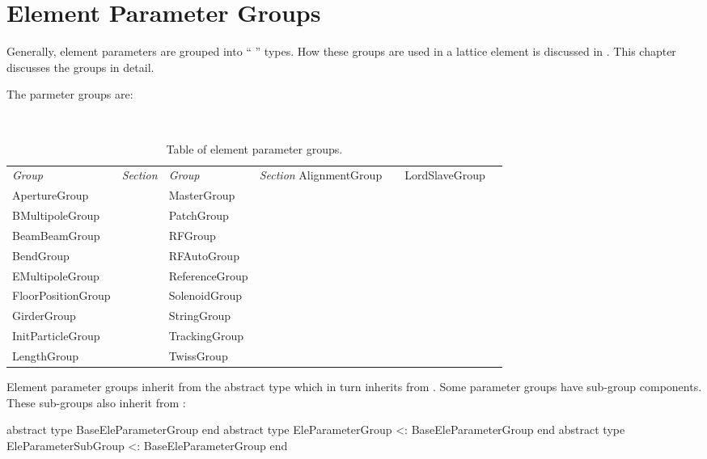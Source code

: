 \chapter{Element Parameter Groups}
\label{c:ele.groups}

Generally, element parameters are grouped into ``  '' 
types. How these groups are used in a lattice element is discussed in . 
This chapter discusses the groups in detail.

The parmeter groups are:
\begin{table}[htb]
\centering
{\tt
\begin{tabular}{llll} \toprule
  {\it Group}        & {\it Section}             & {\it Group}         & {\it Section}          \midrule
 AlignmentGroup      &       & LordSlaveGroup      &  \\
 ApertureGroup       &        & MasterGroup         &      \\
 BMultipoleGroup     &      & PatchGroup          &       \\ 
 BeamBeamGroup       &       & RFGroup             &          \\
 BendGroup           &            & RFAutoGroup         &      \\
 EMultipoleGroup     &      & ReferenceGroup      &   \\
 FloorPositionGroup  &       & SolenoidGroup       &    \\
 GirderGroup         &          & StringGroup         &      \\
 InitParticleGroup   &   & TrackingGroup       &    \\
 LengthGroup         &          & TwissGroup          &       \\ 
  \bottomrule
\end{tabular}
} 
\caption{Table of element parameter groups.}
\label{t:ele.param.g}
\end{table}

Element parameter groups inherit from the abstract type  which
in turn inherits from . Some
parameter groups have sub-group components. 
These sub-groups also inherit from :
\begin{example}
  abstract type BaseEleParameterGroup end
  abstract type EleParameterGroup <: BaseEleParameterGroup end
  abstract type EleParameterSubGroup <: BaseEleParameterGroup end
\end{example}

